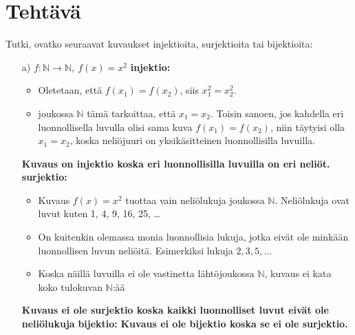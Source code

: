 \documentclass{article}
\newcounter{tehtava}
\begin{document}
        \section*{Tehtävä \thetehtava}
        Tutki, ovatko seuraavat kuvaukset injektioita, surjektioita tai bijektioita:
        \begin{itemize}

            \item[a)] $f : \mathbb{N} \rightarrow \mathbb{N}, \ f(x) = x^2$\newline
            \textbf{injektio:}
            \begin{itemize}
                \item Oletetaan, että $f(x_1) = f(x_2)$, siis $x_1^2 = x_2^2$.
                \item joukossa $\mathbb{N}$ tämä tarkoittaa, että $x_1 = x_2$. Toisin sanoen, jos kahdella eri luonnollisella luvulla olisi sama kuva $f(x_1) = f(x_2)$, niin täytyisi olla $x_1 = x_2$, koska neliöjuuri on yksikäsitteinen luonnollisilla luvuilla.
            \end{itemize}
            \textbf{Kuvaus on injektio koska eri luonnollisilla luvuilla on eri neliöt.}\linebreak
            \textbf{surjektio:}
            \begin{itemize}
                \item Kuvaus $f(x) = x^2$ tuottaa vain neliölukuja joukossa $\mathbb{N}$. Neliölukuja ovat luvut kuten 1, 4, 9, 16, 25, \dots
                \item On kuitenkin olemassa monia luonnollisia lukuja, jotka eivät ole minkään luonnollisen luvun neliöitä. Esimerkiksi lukuja \( 2, 3, 5, \dots\)
                \item Koska näillä luvuilla ei ole vastinetta lähtöjoukossa $\mathbb{N}$, kuvaus ei kata koko tulokuvan $\mathbb{N}$:ää
            \end{itemize}
            \textbf{Kuvaus ei ole surjektio koska kaikki luonnolliset luvut eivät ole neliölukuja}\linebreak
            \textbf{bijektio:}\newline
            \textbf{Kuvaus ei ole bijektio koska se ei ole surjektio.}


\end{itemize}
\end{document}
